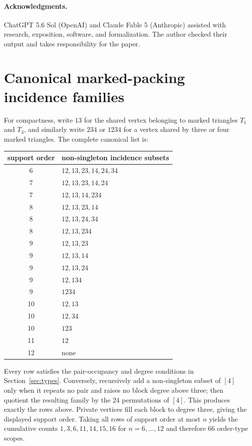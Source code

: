 \documentclass[11pt]{article}
\theoremstyle{definition}
\begin{document}
\paragraph{Acknowledgments.}
ChatGPT 5.6 Sol (OpenAI) and Claude Fable 5 (Anthropic) assisted with research,
exposition, software, and formalization.  The author checked their output and
takes responsibility for the paper.

\appendix

\section{Canonical marked-packing incidence families}\label{app:types}

For compactness, write $13$ for the shared vertex belonging to marked
triangles $T_1$ and $T_3$, and similarly write $234$ or $1234$ for a vertex
shared by three or four marked triangles.  The complete canonical list is:

\begin{center}
\begin{tabular}{cl}
\toprule
support order & non-singleton incidence subsets \\
\midrule
6  & $12,13,23,14,24,34$ \\
7  & $12,13,23,14,24$ \\
7  & $12,13,14,234$ \\
8  & $12,13,23,14$ \\
8  & $12,13,24,34$ \\
8  & $12,13,234$ \\
9  & $12,13,23$ \\
9  & $12,13,14$ \\
9  & $12,13,24$ \\
9  & $12,134$ \\
9  & $1234$ \\
10 & $12,13$ \\
10 & $12,34$ \\
10 & $123$ \\
11 & $12$ \\
12 & none \\
\bottomrule
\end{tabular}
\end{center}

Every row satisfies the pair-occupancy and degree conditions in
Section~\ref{sec:types}.  Conversely, recursively add a non-singleton subset
of $[4]$ only when it repeats no pair and raises no block degree above three;
then quotient the resulting family by the 24 permutations of $[4]$.  This
produces exactly the rows above.  Private vertices fill each block to degree
three, giving the displayed support order.  Taking all rows of support order
at most $n$ yields the cumulative counts $1,3,6,11,14,15,16$ for
$n=6,\ldots,12$ and therefore 66 order-type scopes.

\small


\end{document}
